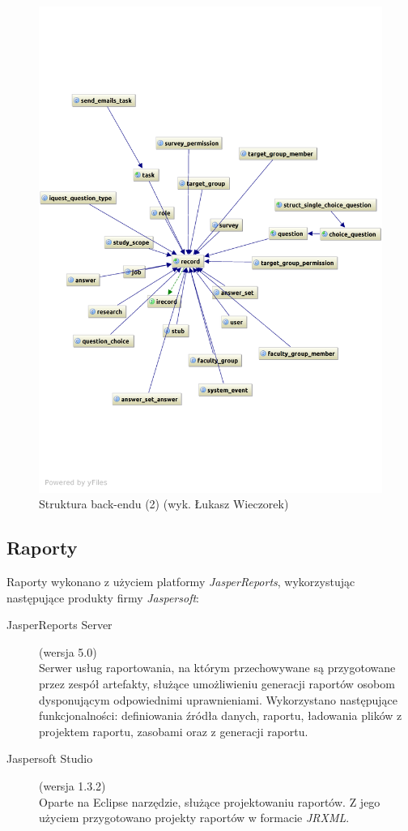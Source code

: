 \begin{figure}[H]
\begin{center}
\includegraphics[width=\textwidth]{figures/lw/backend2.pdf} 
\end{center}
\caption{Struktura back-endu (2) (wyk. Łukasz Wieczorek)}\label{rys:back-end2}
\end{figure}
\newpage

\subsection{Raporty}
\label{Chapter661}

Raporty wykonano z użyciem platformy \textit{JasperReports}, wykorzystując następujące produkty firmy \textit{Jaspersoft}:

\begin{description}
\item[JasperReports Server] (wersja 5.0) \hfill \\
Serwer usług raportowania, na którym przechowywane są przygotowane przez zespół artefakty, służące umożliwieniu generacji raportów osobom dysponującym odpowiednimi uprawnieniami. Wykorzystano następujące funkcjonalności: definiowania źródła danych, raportu, ładowania plików z projektem raportu, zasobami oraz z generacji raportu.
\item[Jaspersoft Studio] (wersja 1.3.2) \hfill \\
Oparte na Eclipse narzędzie, służące projektowaniu raportów. Z jego użyciem przygotowano projekty raportów w formacie \textit{JRXML}.
\end{description}

